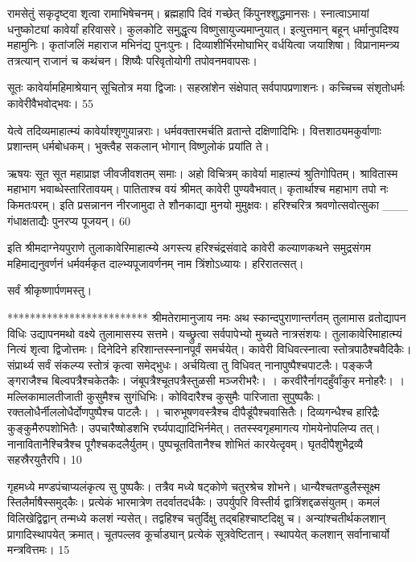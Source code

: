 रामसेतुं सकृदृष्ट्वा शृत्वा रामाभिषेचनम्।
ब्रह्महापि दिवं गच्छेत् किंपुनश्शुद्धमानसः।
स्नात्वाऽमायां धनुष्कोट्यां कावेर्यां हरिवासरे।
कुलकोटि समुद्धृत्य विष्णुसायुज्यमाप्नुयात्।
इत्युत्तमान् बहून् धर्मानुपदिश्य महामुनिः।
कृतांजलिं महाराज मभिनंद्य पुनःपुनः।
दिव्याशीर्भिरमोघाभिर् वर्धयित्वा जयाशिषा।
विप्रानामन्त्र्य तत्रत्यान् राजानं च कथंचन।
शिष्यैः परिवृतोयोगी तपोवनमवापसः।

सूतः
कावेर्यामहिमाश्रेयान् सूचितोत्र मया द्विजाः।
सहस्रांशेन संक्षेपात् सर्वपापप्रणाशनः।
कच्चिच्च संशृतोधर्मः कावेरीवैभवोद्भवः।
55

येत्वे तदिव्यमाहात्म्यं कावेर्याश्शृणुयान्नराः।
धर्मवक्तारमर्चति व्रतान्ते दक्षिणादिभिः।
वित्तशाठ्यमकुर्वाणाः प्रशान्तम् धर्मबोधकम्।
भुक्त्वैह सकलान् भोगान् विष्णुलोकं प्रयांति ते।

ऋषयः
सूत सूत महाप्राज्ञ जीवजीवशतम् समाः।
अहो विचित्रम् कावेर्या माहात्म्यं श्रुतिगोपितम्।
श्रावितास्म महाभाग भवाब्धेस्तारितावयम्।
पातिताश्च वयं श्रीमत् कावेरी पुण्यवैभवात्।
कृतार्थाश्च महाभाग तपो नः किमतःपरम्।
इति प्रसन्नानन नीरजामुदा ते
शौनकाद्या मुनयो मुमुक्षवः।
हरिश्चरित्र श्रवणोत्सवोत्सुका
___ गंधाक्षताद्यैः पुनरप्य पूजयन्।
60

इति श्रीमदाग्नेयपुराणे तुलाकावेरिमाहात्म्ये अगस्त्य हरिश्चंद्रसंवादे कावेरी कल्याणकथने समुद्रसंगम महिमाद्यनुवर्णनं धर्मवर्मकृत दाल्भ्यपूजावर्णनम्
नाम त्रिंशोऽध्यायः।
हरिरातत्सत्।

सर्वं श्रीकृष्णार्पणमस्तु।

*************************
श्रीमतेरामानुजाय नमः अथ स्कान्दपुराणान्तर्गतम्
तुलामास व्रतोद्यापन विधिः उद्यापनमथो वक्ष्ये तुलामासस्य सत्तमे।
यच्छ्रुत्वा सर्वपापेभ्यो मुच्यते नात्रसंशयः।
तुलाकावेरिमाहात्म्यं नित्यं शृत्वा द्विजोत्तमः।
दिनेदिने हरिशान्तस्स्नानपूर्वं समर्चयेत्।
कावेरी विधिवत्स्नात्वा स्तोत्रपाठैश्चवैदिकैः।
संप्रार्थ्य सर्वं संकल्प्य स्तोत्रं कृत्वा समेद्भुधः।
अर्चयित्वा तु विधिवत् नानापुष्पैश्चपाटलैः।
पङ्कजै ङ्गराजैश्च बिल्वपत्रैश्चकेतकैः।
जंबूपत्रैश्चूतपत्रैस्तुळसी मञ्जरीभरैः।
।
करवीरैर्नागदहुँर्वांकुर मनोहरैः।
।
मल्लिकामालतीजाती कुसुमैश्च सुगंधिभिः।
कोविदारैश्च कुसुमैः पारिजाता सुपुष्पकैः।
रक्तलोधैर्नीललोधैर्दोणपुष्पैश्च पाटलैः।
।
चारुभूषणवस्त्रैश्च दीपैडूंपैश्चवासितैः।
दिव्यगन्धैश्च हारिद्रैः कुङ्कुमैरुपशोभितैः।
उपचारैष्षोडशभि रर्घ्यपाद्यादिभिर्नमेत्।
ततस्स्वगृहमागत्य गोमयेनोपलिप्य तत्।
नानावितानैश्चित्रैश्च पूगैश्चकदलैर्युतम्।
पुष्पचूतवितानैश्च शोभितं कारयेत्दृवम्।
घृतदीपैशुभैद्रव्यै सहस्रैरयुतैरपि।
10

गृहमध्ये मण्डपंचाप्यलंकृत्य सु पुष्पकैः।
तत्रैव मध्ये षट्कोणे चतुरश्रेच शोभने।
धान्यैश्चतण्डुलैस्सूक्ष्म स्तिलैर्माषैस्समुद्कैः।
प्रत्येकं भारमात्रेण तदर्वातदर्धकैः।
उपर्युपरि विस्तीर्य द्वात्रिंशद्दळसंयुतम्।
कमलं विलिखेद्विद्वान् तन्मध्ये कलशं न्यसेत्।
तद्वहिश्च चतुर्दिक्षु तद्बहिश्चाष्टदिक्षु च।
अन्यांश्चतीर्थकलशान् प्रागादिस्थापयेत् क्रमात्।
चूतपल्लव कूर्चाड्यान् प्रत्येकं सूत्रवेष्टितान्।
स्थापयेत् कलशान् सर्वानाचार्यो मन्त्रवित्तमः।
15

